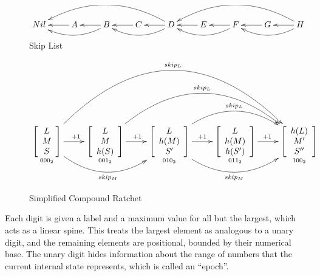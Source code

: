 \documentclass{article}
\begin{document}
	\begin{figure}[h]
		\centering
		
		$\xymatrix{
			  Nil
			& A \ar[l]
			& B \ar[l] , \ar@/^1pc/[ll]
			& C \ar[l]
			& D \ar[l] , \ar@/^1pc/[ll] , \ar@/_2pc/[llll]
			& E \ar[l]
			& F \ar[l] , \ar@/^1pc/[ll]
			& G \ar[l]
			& H \ar[l] , \ar@/^1pc/[ll] , \ar@/_2pc/[llll]
		}$
	
		\caption{Skip List}
		\label{fig:skip-list}
	\end{figure}

	\begin{figure}[h]
		\centering
		
		$\xymatrix{
		    \underset{000_{2}}{\left[ { \begin{array}{cc} L \\ M  \\ S \end{array} } \right]}
				\ar[r]^{+1}
				\ar@/_3pc/[rr]_{skip_{M}}
				\ar@/^7pc/[rrrr]^{skip_{L}}
    	 & \underset{001_{2}}{\left[ { \begin{array}{cc} L \\ M  \\ h(S) \end{array} } \right]}
	      		\ar[r]^{+1}
	      		\ar@/^4.75pc/[rrr]^{skip_{L}}
	     & \underset{010_{2}}{\left[ { \begin{array}{cc} L \\ h(M)  \\ S' \end{array} } \right]}
	      		\ar[r]^{+1}
	      		\ar@/_3pc/[rr]_{skip_{M}}
	      		\ar@/^3pc/[rr]^{skip_{L}}
    	 & \underset{011_{2}}{\left[ { \begin{array}{cc} L \\ h(M)  \\ h(S') \end{array} } \right]}
	      		\ar[r]^{+1}
	     & \underset{100_{2}}{\left[ { \begin{array}{cc} h(L) \\ M'  \\ S'' \end{array} } \right]}
		}$

		\caption{Simplified Compound Ratchet}
		\label{fig:compound-ratchet}
	\end{figure}

	Each digit is given a label and a maximum value for all but the largest, which acts as a linear spine. This treats the largest element as analogous to a unary digit, and the remaining elements are positional, bounded by their numerical base. The unary digit hides information about the range of numbers that the current internal state represents, which is called an ``epoch''.
	
\end{document}
